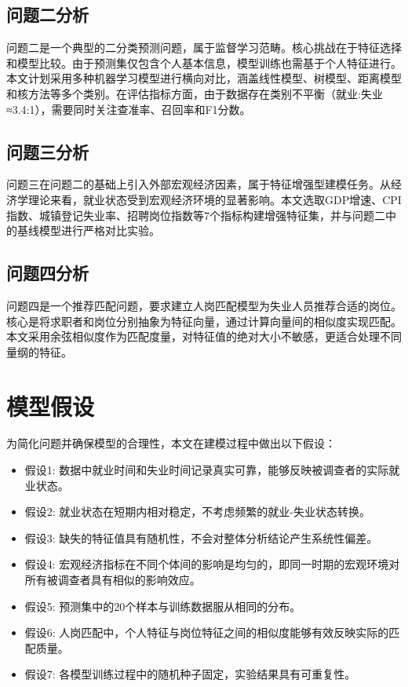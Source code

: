 \documentclass[withoutpreface,bwprint]{cumcmthesis}
\begin{document}
\subsection{问题二分析}
问题二是一个典型的二分类预测问题，属于监督学习范畴。核心挑战在于特征选择和模型比较。由于预测集仅包含个人基本信息，模型训练也需基于个人特征进行。本文计划采用多种机器学习模型进行横向对比，涵盖线性模型、树模型、距离模型和核方法等多个类别。在评估指标方面，由于数据存在类别不平衡（就业:失业≈3.4:1），需要同时关注查准率、召回率和F1分数。

\subsection{问题三分析}
问题三在问题二的基础上引入外部宏观经济因素，属于特征增强型建模任务。从经济学理论来看，就业状态受到宏观经济环境的显著影响。本文选取GDP增速、CPI指数、城镇登记失业率、招聘岗位指数等7个指标构建增强特征集，并与问题二中的基线模型进行严格对比实验。

\subsection{问题四分析}
问题四是一个推荐匹配问题，要求建立人岗匹配模型为失业人员推荐合适的岗位。核心是将求职者和岗位分别抽象为特征向量，通过计算向量间的相似度实现匹配。本文采用余弦相似度作为匹配度量，对特征值的绝对大小不敏感，更适合处理不同量纲的特征。

\section{模型假设}

为简化问题并确保模型的合理性，本文在建模过程中做出以下假设：

\begin{itemize}[itemindent=2em]
\item 假设1: 数据中就业时间和失业时间记录真实可靠，能够反映被调查者的实际就业状态。
\item 假设2: 就业状态在短期内相对稳定，不考虑频繁的就业-失业状态转换。
\item 假设3: 缺失的特征值具有随机性，不会对整体分析结论产生系统性偏差。
\item 假设4: 宏观经济指标在不同个体间的影响是均匀的，即同一时期的宏观环境对所有被调查者具有相似的影响效应。
\item 假设5: 预测集中的20个样本与训练数据服从相同的分布。
\item 假设6: 人岗匹配中，个人特征与岗位特征之间的相似度能够有效反映实际的匹配质量。
\item 假设7: 各模型训练过程中的随机种子固定，实验结果具有可重复性。
\end{itemize}
\end{document}
